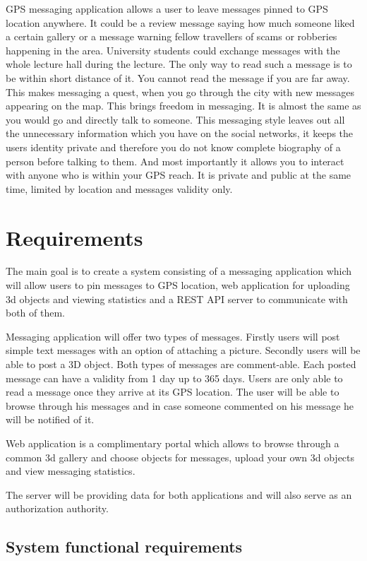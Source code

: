 \documentclass[thesis=M,english]{FITthesis}[2012/10/20]
\begin{document}
GPS messaging application allows a user to leave messages pinned to GPS location anywhere. It could be a review message saying how much someone liked a certain gallery or a message warning fellow travellers of scams or robberies happening in the area. University students could exchange messages with the whole lecture hall during the lecture. The only way to read such a message is to be within short distance of it. You cannot read the message if you are far away. This makes messaging a quest, when you go through the city with new messages appearing on the map. This brings freedom in messaging. It is almost the same as you would go and directly talk to someone. This messaging style leaves out all the unnecessary information which you have on the social networks, it keeps the users identity private and therefore you do not know complete biography of a person before talking to them. And most importantly it allows you to interact with anyone who is within your GPS reach. It is private and public at the same time, limited by location and messages validity only.

\chapter{Requirements}

The main goal is to create a system consisting of a messaging application which will allow users to pin messages to GPS location, web application for uploading 3d objects and viewing statistics and a REST API server to communicate with both of them. 

Messaging application will offer two types of messages. Firstly users will post simple text messages with an option of attaching a picture. Secondly users will be able to post a 3D object. Both types of messages are comment-able. Each posted message can have a validity from 1 day up to 365 days. Users are only able to read a message once they arrive at its GPS location. The user will be able to browse through his messages and in case someone commented on his message he will be notified of it. 

Web application is a complimentary portal which allows to browse through a common 3d gallery and choose objects for messages, upload your own 3d objects and view messaging statistics.

The server will be providing data for both applications and will also serve as an authorization authority.

\section{System functional requirements}
\end{document}
